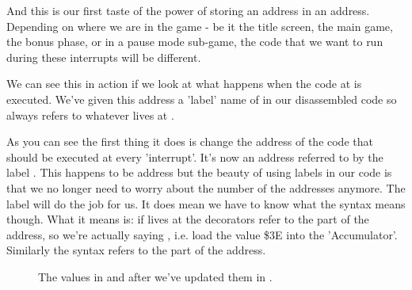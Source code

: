 And this is our first taste of the power of storing an address in an address. Depending on where we are in the game - be it the
title screen, the main game, the bonus phase, or in a pause mode sub-game, the code that we want to run during these interrupts
will be different.

We can see this in action if we look at what happens when the code at  is executed. We've given this address 
a 'label' name of  in our disassembled code so  always refers to whatever lives at
. 

%


As you can see the first thing it does is change the address of the code that should be executed at every 'interrupt'. It's now an
address referred to by the label . This happens to be address  but the beauty
of using labels in our code is that we no longer need to worry about the number of the addresses anymore. The label will do the job
for us. It does mean we have to know what the syntax  means though. What it means is:
if  lives at  the \icode{\#<} decorators refer to the  part of the
address, so we're actually saying , i.e. load the value \$3E into the 'Accumulator'. Similarly the syntax
 refers to the  part of the address.

\begin{figure}[H]
  {
    \setlength{\tabcolsep}{3.0pt}
    \setlength\cmidrulewidth{\heavyrulewidth} %
    \begin{adjustbox}{width=7cm,center}
    \end{adjustbox}
  }\caption{The values in  and  after we've updated them in .}
\end{figure}

